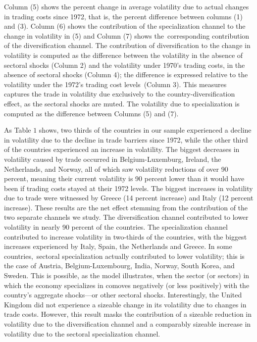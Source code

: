 \documentclass[12pt]{article}
\begin{document}
Column (5) shows the percent change in average volatility due to actual
changes in trading costs since 1972, that is, the percent difference between
columns (1) and (3). Column (6) shows the contribution of the specialization
channel to the change in volatility in (5) and Column (7) shows the\
corresponding contribution of the diversification channel. The contribution
of diversification to the change in volatility is computed as the difference
between the volatility in the absence of sectoral shocks (Column 2) and the
volatility under 1970's trading costs, in the absence of sectoral shocks
(Column 4); the difference is expressed relative to the volatility under the
1972's trading cost levels\ (Column 3). This measures captures the trade in
volatility due exclusively to the country-diversification effect, as the
sectoral shocks are muted. The volatility due to specialization is computed
as the difference between Columns (5) and (7).

As Table $1$ shows, two thirds of the countries in our sample experienced a
decline in volatility due to the decline in trade barriers since 1972, while
the other third of the countries experienced an increase in volatility. The
biggest decreases in volatility caused by trade occurred in
Belgium-Luxemburg, Ireland, the Netherlands, and Norway, all of which saw
volatility reductions of over 90 percent, meaning their current volatility
is 90 percent lower than it would have been if trading costs stayed at their
1972 levels. The biggest increases in volatility due to trade were witnessed
by Greece (14 percent increase) and Italy (12 percent increase). These
results are the net effect stemming from the contribution of the two
separate channels we study. The diversification channel contributed to lower
volatility in nearly 90 percent of the countries. The specialization channel
contributed to increase volatility in two-thirds of the countries, with the
biggest increases experienced by Italy, Spain, the Netherlands and Greece.
In some countries,\ sectoral specialization actually contributed to lower
volatility; this is the case of Austria, Belgium-Luxembourg, India, Norway,
South Korea, and Sweden. This is possible, as the model illustrates, when
the sector (or sectors) in which the economy specializes in comoves
negatively (or less positively) with the country's aggregate shocks---or
other sectoral shocks. Interestingly, the United Kingdom did not experience
a sizeable change in its volatility due to changes in trade costs. However,
this result masks the contribution of a sizeable reduction in volatility due
to the diversification channel and a comparably sizeable increase in
volatility due to the sectoral specialization channel.
\end{document}
